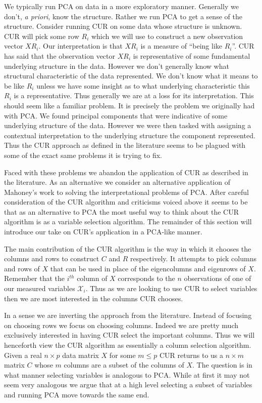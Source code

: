 \documentclass{book}
\begin{document}
We typically run PCA on data in a more exploratory manner. Generally we don't, \emph{a priori}, know the structure. Rather we run PCA to get a sense of the structure. Consider running CUR on some data whose structure is unknown. CUR will pick some row $R_i$ which we will use to construct a new observation vector $XR_i$. Our interpretation is that $XR_i$ is a measure of ``being like $R_i$''. CUR has said that the observation vector $XR_i$ is representative of some fundamental underlying structure in the data. However we don't generally know what structural characteristic of the data represented. We don't know what it means to be like $R_i$ unless we have some insight as to what underlying characteristic this $R_i$ is a representative. Thus generally we are at a loss for its interpretation. This should seem like a familiar problem. It is precisely the problem we originally had with PCA. We found principal components that were indicative of some underlying structure of the data. However we were then tasked with assigning a contextual interpretation to the underlying structure the component represented. Thus the CUR approach as defined in the literature seems to be plagued with some of the exact same problems it is trying to fix. 

Faced with these problems we abandon the application of CUR as described in the literature. As an alternative we consider an alternative application of Mahoney's work to solving the interpretational problems of PCA. After careful consideration of the CUR algorithm and criticisms voiced above it seems to be that as an alternative to PCA the most useful way to think about the CUR algorithm is as a variable selection algorithm. The remainder of this section will introduce our take on CUR's application in a PCA-like manner. 

The main contribution of the CUR algorithm is the way in which it chooses the columns and rows to construct $C$ and $R$ respectively. It attempts to pick columns and rows of $X$ that can be used in place of the eigencolumns and eigenrows of $X$. Remember that the $i^{th}$ column of $X$ corresponds to the $n$ observations of one of our measured variables $\mathscr{X}_i$. Thus as we are looking to use CUR to select variables then we are most interested in the columns CUR chooses.  

In a sense we are inverting the approach from the literature. Instead of focusing on choosing rows we focus on choosing columns. Indeed we are pretty much exclusively interested in having CUR select the important columns. Thus we will henceforth view the CUR algorithm as essentially a column selection algorithm. Given a real $n \times p$ data matrix $X$ for some $m \leq p$ CUR returns to us a $n \times m$ matrix $C$ whose $m$ columns are a subset of the columns of $X$. The question is in what manner selecting variables is analogous to PCA. While at first it may not seem very analogous we argue that at a high level selecting a subset of variables and running PCA move towards the same end. 
\end{document}
